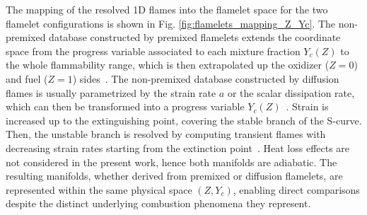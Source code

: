 \documentclass[preprint,12pt,authoryear]{elsarticle}
\begin{document}
The mapping of the resolved 1D flames into the flamelet space for the two flamelet configurations is shown in Fig. \ref{fig:flamelets_mapping_Z_Yc}. The non-premixed database constructed by premixed flamelets extends the coordinate space from the progress variable associated to each mixture fraction $Y_c(Z)$ to the whole flammability range, which is then extrapolated up the oxidizer ($Z = 0$) and fuel ($Z = 1$) sides~\citep{govert_effect_2018}. The non-premixed database constructed by diffusion flames is usually parametrized by the strain rate $a$ or the scalar dissipation rate, which can then be transformed into a progress variable $Y_c(Z)$~\citep{Hasse_PCI}.
Strain is increased up to the extinguishing point, covering the stable branch of the S-curve. Then, the unstable branch is resolved by computing transient flames with decreasing strain rates starting from the extinction point~\citep{both_high-fidelity_2023}. Heat loss effects are not considered in the present work, hence both manifolds are adiabatic. 
The resulting manifolds, whether derived from premixed or diffusion flamelets, are represented within the same physical space $(Z, Y_c)$, enabling direct comparisons despite the distinct underlying combustion phenomena they represent.







\end{document}
